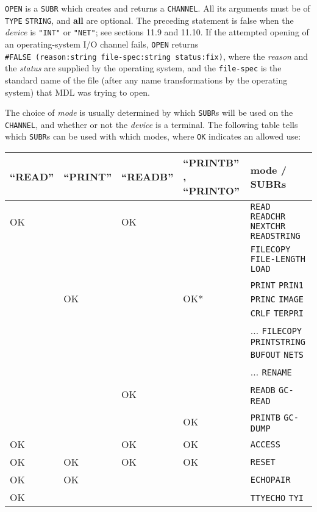 \documentclass[a4paper,]{article}
\begin{document}
\texttt{OPEN}  is a \texttt{SUBR} which creates and returns a \texttt{CHANNEL}. All its
arguments must be of \texttt{TYPE} \texttt{STRING}, and \textbf{all} are optional. The preceding statement is false when
the \emph{device} is \texttt{"INT"} or \texttt{"NET"}; see sections 11.9 and 11.10. If the attempted opening of an
operating-system I/O channel fails, \texttt{OPEN} returns \texttt{\#FALSE\ (reason:string\ file-spec:string\ status:fix)},
where the \emph{reason} and the \emph{status} are supplied by the operating system, and the \texttt{file-spec} is the
standard name of the file (after any name transformations by the operating system) that MDL was trying to open.

The choice of \emph{mode} is usually determined by which \texttt{SUBR}s will be used on the \texttt{CHANNEL}, and whether
or not the \emph{device} is a terminal. The following table tells which \texttt{SUBR}s can be used with which modes, where
\texttt{OK} indicates an allowed use:

\begin{longtable}[]{@{}lllll@{}}
\toprule
``READ'' \index{\texttt{""READ""}} & ``PRINT'' \index{\texttt{PRINT}} & ``READB'' \index{\texttt{""READB""}} & ``PRINTB''
\index{\texttt{""PRINTB""}}, ``PRINTO'' \index{\texttt{""PRINTO""}|textbf} & mode / SUBRs\tabularnewline
\midrule
\endhead
OK & & OK & & \texttt{READ} \texttt{READCHR} \index{\texttt{READCHR}} \texttt{NEXTCHR} \index{\texttt{NEXTCHR}}
\texttt{READSTRING} \index{\texttt{READSTRING}}\tabularnewline
& & & & \texttt{FILECOPY} \texttt{FILE-LENGTH} \index{\texttt{FILE-LENGTH}} \texttt{LOAD}
\index{\texttt{LOAD}}\tabularnewline
& OK & & OK* & \texttt{PRINT} \index{\texttt{""PRINT""}|textbf} \texttt{PRIN1} \index{\texttt{PRIN1}} \texttt{PRINC}
\index{\texttt{PRINC}} \texttt{IMAGE} \index{\texttt{IMAGE}} \texttt{CRLF} \index{\texttt{CRLF}} \texttt{TERPRI}
\index{\texttt{TERPRI}}\tabularnewline
& & & & \(\ldots\) \texttt{FILECOPY} \index{\texttt{FILECOPY}} \texttt{PRINTSTRING} \index{\texttt{PRINTSTRING}}
\texttt{BUFOUT} \index{\texttt{BUFOUT}} \texttt{NETS} \index{\texttt{NETS}}\tabularnewline
& & & & \(\ldots\) \texttt{RENAME} \index{\texttt{RENAME}}\tabularnewline
& & OK & & \texttt{READB} \texttt{GC-READ} \index{\texttt{GC-READ}}\tabularnewline
& & & OK & \texttt{PRINTB} \texttt{GC-DUMP} \index{\texttt{GC-DUMP}}\tabularnewline
OK & & OK & OK & \texttt{ACCESS} \index{\texttt{ACCESS}}\tabularnewline
OK & OK & OK & OK & \texttt{RESET} \index{\texttt{RESET}}\tabularnewline
OK & OK & & & \texttt{ECHOPAIR} \index{\texttt{ECHOPAIR}}\tabularnewline
OK & & & & \texttt{TTYECHO} \index{\texttt{TTYECHO}} \texttt{TYI} \index{\texttt{TYI}}\tabularnewline
\bottomrule
\end{longtable}
\end{document}
